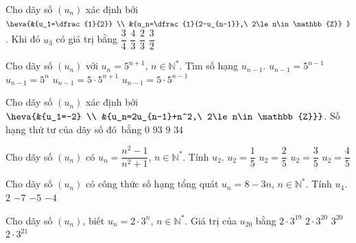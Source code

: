 \begin{ex}%
	Cho dãy số $\left(u_n  \right)$ xác định bởi $\heva{&{u_1=\dfrac{1}{2}} \\
	&{u_n=\dfrac{1}{2-u_{n-1}},\ 2\le  n\in\mathbb{Z}}
	}$. Khi đó  $u_3$ có giá trị bằng
	\choice 
		{\True $\dfrac{3}{4}$} 
		{$\dfrac{4}{3}$} 
		{$\dfrac{2}{3}$} 
		{$\dfrac{3}{2}$} 
\end{ex}

\begin{ex}%
	Cho dãy số $\left(u_n \right)$ với $u_n=5^{n+1}$, $n\in \mathbb{N}^{*}$. Tìm  số hạng $u_{n-1}$.
	 \choice
		{$u_{n-1}=5^{n-1}$} 
		{\True $u_{n-1}=5^n$} 
		 {$u_{n-1}=5\cdot5^{n+1}$}
		 {$u_{n-1}=5\cdot5^{n-1}$}
\end{ex}

\begin{ex}%
	Cho dãy số $\left(u_n \right)$ xác định bởi $\heva{&{u_1=-2} \\ 
	 &{u_n=2u_{n-1}+n^2,\ 2\le n\in\mathbb{Z}}}$. Số hạng thứ tư của dãy số đó~bằng
	 \choice
		 {$0$}
		{$93$} 
		 {$9$}
		 {\True $34$}
\end{ex}

\begin{ex}%
	Cho dãy  số $\left(u_n \right)$ có $u_n=\dfrac{n^2-1}{n^2+1}$, $n\in\mathbb{N}^*$. Tính $u_2$.
	 \choice
		 {$u_2=\dfrac{1}{5}$}
		 {$u_2=\dfrac{2}{5}$}
		{\True  $u_2=\dfrac{3}{5}$}
		{$u_2=\dfrac{4}{5}$} 
\end{ex}

\begin{ex}%
	Cho dãy số $\left(u_n \right)$ có công thức số hạng tổng quát $u_n=8-3n$, $n\in\mathbb{N}^*$. Tính $u_4$. 
	 \choice
		 {$2$}
		 {$-7$}
		 {$-5$}
		{\True $-4$} 
\end{ex}

\begin{ex}%
	Cho dãy số $\left(u_n \right)$, biết $u_n=2\cdot3^n$, $n\in\mathbb{N}^*$. Giá trị  của $u_{20}$ bằng
	\choice 
		{$2\cdot3^{19}$} 
		{\True  $2\cdot3^{20}$}
		{$3^{20}$} 
		{$2\cdot3^{21\;}$} 
\end{ex}

